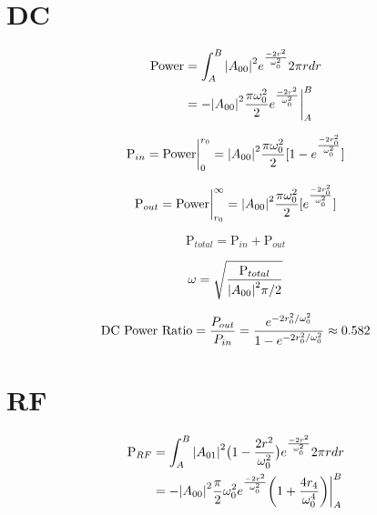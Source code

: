 \documentclass[oneside]{book}
\begin{document}
\begin{appendices}
	\section{DC}
	\begin{equation}
	\begin{split}
	\text{Power} &= \int_{A}^{B} \abs{A_{00}}^2e^{\frac{-2r^2}{\omega_{0}^2}} 2\pi r dr\\
			&= -\abs{A_{00}}^2 \frac{\pi \omega_{0}^2}{2} e^{\frac{-2r^2}{\omega_{0}^2}} \biggr\rvert_A^B
	\end{split}
	\end{equation}
	
	\begin{equation}
	\text{P}_{in} = \text{Power} \biggr\rvert_0^{r_0} = \abs{A_{00}}^2 \frac{\pi \omega_{0}^2}{2} [1 - e^{\frac{-2r_0^2}{\omega_{0}^2}}]
	\end{equation}
	
	\begin{equation}
	\text{P}_{out} = \text{Power} \biggr\rvert_{r_0}^{\infty} = \abs{A_{00}}^2 \frac{\pi \omega_{0}^2}{2} [e^{\frac{-2r_0^2}{\omega_{0}^2}}]
	\end{equation}
	
	\begin{equation}
	\text{P}_{total} =  \text{P}_{in} + \text{P}_{out}
	\end{equation}
	
	\begin{equation}
	\omega = \sqrt{\frac{\text{P}_{total}}{\abs{A_{00}}^2 \pi / 2}}
	\end{equation}
	
	\begin{equation}
	\text{DC Power Ratio} 
	= \frac{P_{out}}{P_{in}} \\
	= \frac{e^{-2r_0^2/ \omega_{0}^2}} {1 - e^{-2r_0^2/ \omega_{0}^2 }} \approx 0.582
	\end{equation}
	
	\section{RF}
	
	\begin{equation}
	\begin{split}
	\text{P}_{RF} &= \int_{A}^{B} \abs{A_{01}}^2 \big(1-\frac{2r^2}{\omega_{0}^2}\big) e^{\frac{-2r^2}{\omega_{0}^2}} 2\pi r dr\\
	&= -\abs{A_{00}}^2 \frac{\pi}{2} \omega_{0}^2 e^{\frac{-2r^2}{\omega_{0}^2}} \bigg(1 + \frac{4 r_4}{\omega_{0}^4} \bigg)  \biggr\rvert_A^B
	\end{split}
	\end{equation}
	

\end{appendices}
\end{document}
